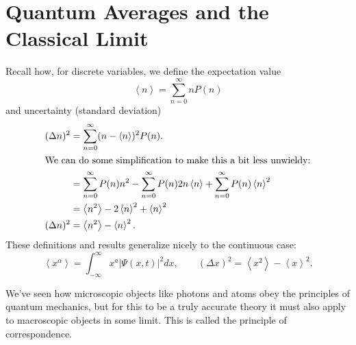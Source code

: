 \documentclass[../p052main.tex]{subfiles}
\begin{document}

\section{Quantum Averages and the Classical Limit}
Recall how, for discrete variables, we define the expectation value
\[ \left< n \right> = \sum_{n=0}^{\infty} nP(n) \]
and uncertainty (standard deviation)
\begin{align*}
    (\Delta n)^2 &= \sum_{n=0}^{\infty} (n - \left< n \right>)^2P(n). \\
    \intertext{We can do some simplification to make this a bit less unwieldy:}
    &= \sum_{n=0}^{\infty} P(n) n^2 - \sum_{n=0}^{\infty} P(n) 2n\left< n \right> + \sum_{n=0}^{\infty}P(n) \left< n \right>^2 \\
    &= \left< n^2 \right> - 2\left< n \right>^2 + \left< n \right>^2 \\
    (\Delta n)^2 &= \left< n^2 \right> - \left< n \right>^2.
\end{align*}
These definitions and results generalize nicely to the continuous case:
\[ \left< x^{\alpha} \right> = \int_{-\infty}^{\infty} x^{a} |\Psi(x,t)|^2 dx, \qquad (\Delta x)^2 = \left< x^2 \right> - \left< x \right>^2. \]

We've seen how microscopic objects like photons and atoms obey the principles of quantum mechanics, but for this to be a truly accurate theory it must also apply to macroscopic objects in some limit.
This is called the principle of correspondence.
\end{document}
